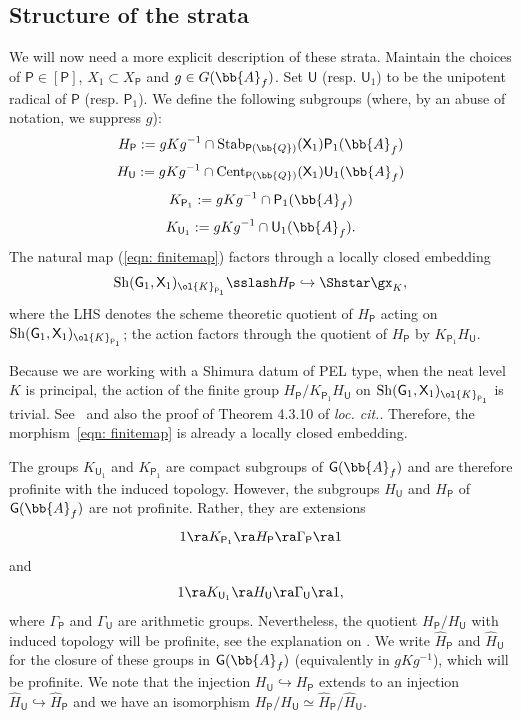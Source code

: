 \documentclass[letterpaper,11pt]{amsart}
\begin{document}
\subsection{Structure of the strata}\label{subsub: SVStrata} 
We will now need a  more explicit description of these strata. Maintain the choices of $\mathsf{P}\in [\mathsf{P}]$, $X_1\subset X_{\mathsf{P}}$ and $g\in G(\bb{A}_f)$. Set $\mathsf{U}$ (resp. $\mathsf{U}_1$) to be the unipotent radical of $\mathsf{P}$ (resp. $\mathsf{P}_1$). We define the following subgroups (where, by an abuse of notation, we suppress $g$):
\[H_{\mathsf{P}} := gKg^{-1} \cap \mathrm{Stab}_{\mathsf{P}(\bb{Q})}(\mathsf{X}_{1})\mathsf{P}_1(\bb{A}_{f}) \]
\[ H_{\mathsf{U}} := gKg^{-1} \cap \mathrm{Cent}_{\mathsf{P}(\bb{Q})}(\mathsf{X}_{1})\mathsf{U}_1(\bb{A}_{f}) \]
\[ K_{\mathsf{P}_{1}} := gKg^{-1} \cap \mathsf{P}_{1}(\bb{A}_{f})  \]
\[ K_{\mathsf{U}_1} := gKg^{-1} \cap \mathsf{U}_1(\bb{A}_{f}).  \]
The natural map (\ref{eqn: finitemap}) factors through a locally closed embedding
\begin{equation}{\label{eqn: locallyclosedembedding}}
\mathrm{Sh}(\mathsf{G}_{1},\mathsf{X}_{1})_{\ol{K}_{\mathsf{P}_1}}\sslash H_{\mathsf{P}} \hookrightarrow \Shstar\gx_{K},
\end{equation}
where the LHS denotes the scheme theoretic quotient of $H_{\mathsf{P}}$ acting on $\mathrm{Sh}(\mathsf{G}_{1},\mathsf{X}_{1})_{\ol{K}_{\mathsf{P}_1}}$; the action factors through the quotient of $H_{\mathsf{P}}$ by $K_{\mathsf{P}_1}H_{\mathsf{U}}$. 

\begin{remark}\label{rem:trivial quotient}
Because we are working with a Shimura datum of PEL type, when the neat level $K$ is principal, the action of the finite group $H_{\mathsf{P}}/K_{\mathsf{P}_1}H_{\mathsf{U}}$ on $\mathrm{Sh}(\mathsf{G}_{1},\mathsf{X}_{1})_{\ol{K}_{\mathsf{P}_1}}$ is trivial. See~\cite[Remark 4.3.3]{LanStroh} and also the proof of Theorem 4.3.10 of \emph{loc. cit.}. Therefore, the morphism~\eqref{eqn: finitemap} is already a locally closed embedding. 
\end{remark}

The groups $K_{\mathsf{U}_1}$  and $K_{\mathsf{P}_1}$ are compact subgroups of $\mathsf{G}(\bb{A}_{f})$ and are therefore profinite with the induced topology. However, the subgroups $H_{\mathsf{U}}$ and $H_{\mathsf{P}}$ of $\mathsf{G}(\bb{A}_{f})$ are not profinite. Rather, they are extensions 
\[ 1 \ra K_{\mathsf{P}_1} \ra H_{\mathsf{P}} \ra \Gamma_\mathsf{P} \ra 1 \]
and 
\[ 1 \ra K_{\mathsf{U}_1} \ra H_{\mathsf{U}} \ra \Gamma_{\mathsf{U}} \ra 1, \]
where $\Gamma_\mathsf{P}$ and $\Gamma_\mathsf{U}$ are arithmetic groups. Nevertheless, the quotient $H_{\mathsf{P}}/H_{\mathsf{U}}$ with induced topology will be profinite, see the explanation on \cite[Page 222]{PinkHigherDirectImages}. We write $\hat{H}_\mathsf{P}$ and $\hat{H}_\mathsf{U}$ for the closure of these groups in $\mathsf{G}(\bb{A}_{f})$ (equivalently in $gKg^{-1}$), which will be profinite. We note that the injection $H_{\mathsf{U}} \hookrightarrow H_{\mathsf{P}}$ extends to an injection $\hat{H}_\mathsf{U} \hookrightarrow \hat{H}_\mathsf{P}$ and we have an isomorphism $H_{\mathsf{P}}/H_{\mathsf{U}} \simeq \hat{H}_\mathsf{P}/\hat{H}_\mathsf{U}$. 
\end{document}
